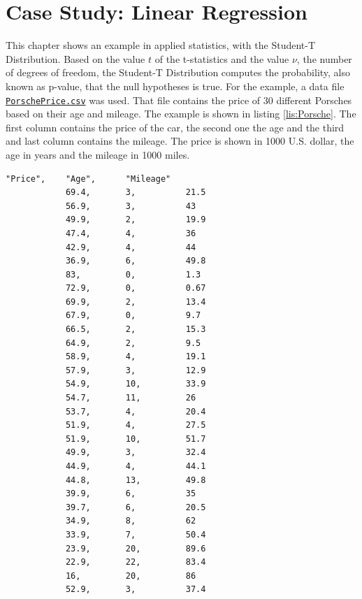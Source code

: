 
\chapter{Case Study: Linear Regression}


	This chapter shows an example in applied statistics, with the Student-T Distribution. Based on the value $t$ of the t-statistics and the value $\nu$, the number of degrees of freedom, the Student-T Distribution computes the probability, also known as p-value, that the null hypotheses is true. For the example, a data file \href{https://vincentarelbundock.github.io/Rdatasets/csv/Stat2Data/PorschePrice.csv}{\lstinline{PorschePrice.csv}} was used. That file contains the price of 30 different Porsches based on their age and mileage. The example is shown in listing \ref{lis:Porsche}. The first column contains the price of the car, the second one the age and the third and last column contains the mileage. The price is shown in 1000 U.S. dollar, the age in years and the mileage in 1000 miles.

	\begin{center}
		\begin{lstlisting}[caption={\lstinline{PorschePrice.csv} Example}, label={lis:Porsche}]
			"Price",	"Age",		"Mileage"
			69.4,		3,			21.5
			56.9,		3,			43
			49.9,		2,			19.9
			47.4,		4,			36
			42.9,		4,			44
			36.9,		6,			49.8
			83,			0,			1.3
			72.9,		0,			0.67
			69.9,		2,			13.4
			67.9,		0,			9.7
			66.5,		2,			15.3
			64.9,		2,			9.5
			58.9,		4,			19.1
			57.9,		3,			12.9
			54.9,		10,			33.9
			54.7,		11,			26
			53.7,		4,			20.4
			51.9,		4,			27.5
			51.9,		10,			51.7
			49.9,		3,			32.4
			44.9,		4,			44.1
			44.8,		13,			49.8
			39.9,		6,			35
			39.7,		6,			20.5
			34.9,		8,			62
			33.9,		7,			50.4
			23.9,		20,			89.6
			22.9,		22,			83.4
			16,			20,			86
			52.9,		3,			37.4
		\end{lstlisting}
	\end{center}

